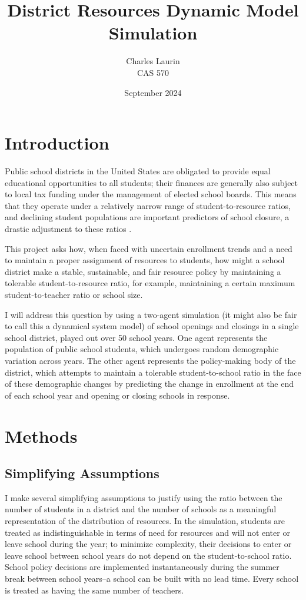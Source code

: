 \documentclass{article}
\title{District Resources Dynamic Model Simulation}
\author{Charles Laurin \\CAS 570}
\date{September 2024}
\begin{document}
\maketitle


\section*{Introduction}
Public school districts in the United States are obligated to provide equal educational opportunities to all students; their finances are generally also subject to local tax funding under the management of elected school boards. This means that they operate under a relatively narrow range of student-to-resource ratios, and declining student populations are important predictors of school closure, a drastic adjustment to these ratios \cite{harris2023extreme}. 

This project asks how, when faced with uncertain enrollment trends and a need to maintain a proper assignment of resources to students, how might a school district make a stable, sustainable, and fair resource policy by maintaining a tolerable student-to-resource ratio, for example, maintaining a certain maximum student-to-teacher ratio or school size.

I will address this question by using a two-agent simulation (it might also be fair to call this a dynamical system model) of school openings and closings in a single school district, played out over 50 school years. One agent represents the population of public school students, which undergoes random demographic variation across years. The other agent represents the policy-making body of the district, which attempts to maintain a tolerable student-to-school ratio in the face of these demographic changes by predicting the change in enrollment at the end of each school year and opening or closing schools in response.

\section*{Methods}
\subsection*{Simplifying Assumptions}
I make several simplifying assumptions to justify using the ratio between the number of students in a district and the number of schools as a meaningful representation of the distribution of resources.
In the simulation, students are treated as indistinguishable in terms of need for resources and will not enter or leave school during the year; to minimize complexity, their decisions to enter or leave school between school years do not depend on the student-to-school ratio. School policy decisions are implemented instantaneously during the summer break between school years--a school can be built with no lead time. Every school is treated as having the same number of teachers.
\end{document}
